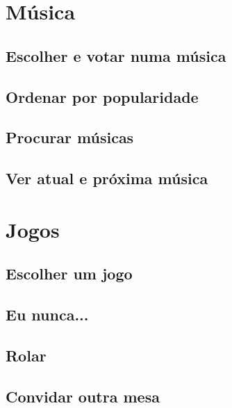 \documentclass{article}
\begin{document}
\section{Música}
\subsection{Escolher e votar numa música}
\subsection{Ordenar por popularidade}
\subsection{Procurar músicas}
\subsection{Ver atual e próxima música}
\section{Jogos}
\subsection{Escolher um jogo}
\subsection{Eu nunca...}
\subsection{Rolar}
\subsection{Convidar outra mesa}
\end{document}
